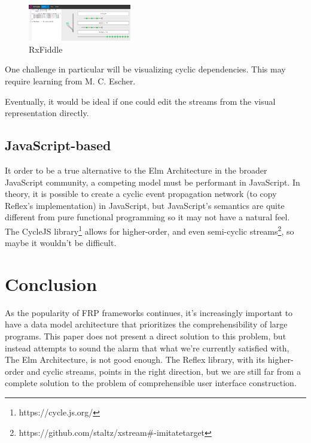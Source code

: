 \documentclass[sigconf]{acmart}
\begin{document}
\begin{figure}[h!]
\includegraphics[width=0.4\textwidth]{rxfiddle}
\caption{RxFiddle}
\label{fig:figure 5}
\end{figure}

One challenge in particular will be visualizing cyclic dependencies. This may require learning from M. C. Escher.

Eventually, it would be ideal if one could edit the streams from the visual representation directly.

\subsection{JavaScript-based}

It order to be a true alternative to the Elm Architecture in the broader JavaScript community, a competing model must be performant in JavaScript. In theory, it is possible to create a cyclic event propagation network (to copy Reflex's implementation) in JavaScript, but JavaScript's semantics are quite different from pure functional programming so it may not have a natural feel.  The CycleJS library\footnote{https://cycle.js.org/} allows for higher-order, and even semi-cyclic streams\footnote{https://github.com/staltz/xstream\#-imitatetarget}, so maybe it wouldn't be difficult. 

\section{Conclusion}

As the popularity of FRP frameworks continues, it's increasingly important to have a data model architecture that prioritizes the comprehensibility of large programs. This paper does not present a direct solution to this problem, but instead attempts to sound the alarm that what we're currently satisfied with, The Elm Architecture, is not good enough. The Reflex library, with its higher-order and cyclic streams, points in the right direction, but we are still far from a complete solution to the problem of comprehensible user interface construction.



\end{document}

